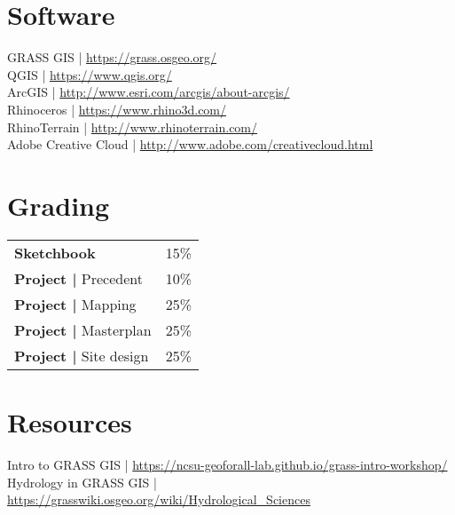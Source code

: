 \documentclass[11pt,article,oneside]{memoir}
\begin{document}
\section{Software}
GRASS GIS | \url{https://grass.osgeo.org/}\\
QGIS | \url{https://www.qgis.org/}\\
ArcGIS | \url{http://www.esri.com/arcgis/about-arcgis/}\\
Rhinoceros | \url{https://www.rhino3d.com/}\\
RhinoTerrain | \url{http://www.rhinoterrain.com/}\\
Adobe Creative Cloud | \url{http://www.adobe.com/creativecloud.html}\\

\section{Grading}
%
\begin{table}[H]
\small
\begin{tabular}{l l}
%
\textbf{Sketchbook} & 15\% \\
\textbf{Project |} Precedent & 10\% \\
\textbf{Project |} Mapping & 25\% \\
\textbf{Project |} Masterplan & 25\% \\
\textbf{Project |} Site design & 25\% \\
%
\end{tabular}
\end{table}

\section{Resources}
Intro to GRASS GIS | \url{https://ncsu-geoforall-lab.github.io/grass-intro-workshop/}\\
Hydrology in GRASS GIS | \url{https://grasswiki.osgeo.org/wiki/Hydrological_Sciences}\\


\end{document}
